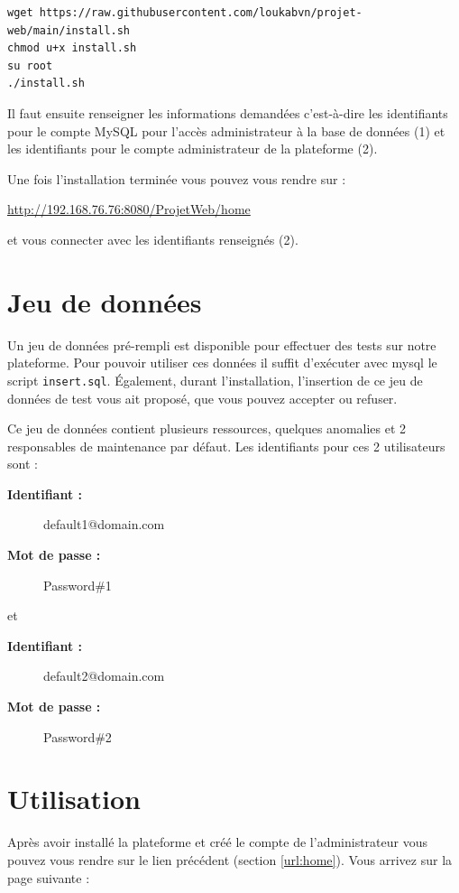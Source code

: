 \begin{verbatim}
wget https://raw.githubusercontent.com/loukabvn/projet-web/main/install.sh
chmod u+x install.sh
su root
./install.sh
\end{verbatim}

Il faut ensuite renseigner les informations demandées c'est-à-dire les identifiants pour le
compte MySQL pour l'accès administrateur à la base de données (1) et les identifiants pour le compte
administrateur de la plateforme (2).

Une fois l'installation terminée vous pouvez vous rendre sur :
\begin{center}
    \label{url:home}
    \url{http://192.168.76.76:8080/ProjetWeb/home}
\end{center}
et vous connecter avec les identifiants renseignés (2).

\section{Jeu de données}

Un jeu de données pré-rempli est disponible pour effectuer des tests sur notre plateforme.
Pour pouvoir utiliser ces données il suffit d'exécuter avec mysql le script \verb:insert.sql:.
Également, durant l'installation, l'insertion de ce jeu de données de test vous ait proposé, que
vous pouvez accepter ou refuser.

Ce jeu de données contient plusieurs ressources, quelques anomalies et 2 responsables de
maintenance par défaut. Les identifiants pour ces 2 utilisateurs sont :
\begin{description}
    \item[\textbf{Identifiant :}] default1@domain.com
    \item[\textbf{Mot de passe :}] Password\#1
\end{description}
et
\begin{description}
    \item[\textbf{Identifiant :}] default2@domain.com
    \item[\textbf{Mot de passe :}] Password\#2
\end{description}

\newpage

\section{Utilisation}

Après avoir installé la plateforme et créé le compte de l'administrateur vous pouvez vous rendre
sur le lien précédent (section \ref{url:home}). Vous arrivez sur la page suivante :

